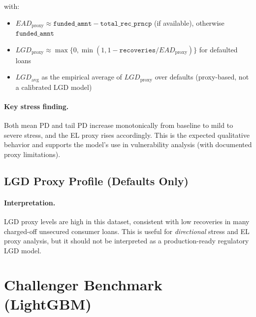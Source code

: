 \documentclass[11pt,a4paper]{article}
\begin{document}
with:
\begin{itemize}[leftmargin=*, itemsep=0.25em]
\item \(EAD_{\text{proxy}} \approx \texttt{funded\_amnt} - \texttt{total\_rec\_prncp}\) (if available), otherwise \(\texttt{funded\_amnt}\)
\item \(LGD_{\text{proxy}} \approx \max\{0,\min(1,1-\texttt{recoveries}/EAD_{\text{proxy}})\}\) for defaulted loans
\item \(LGD_{\text{avg}}\) as the empirical average of \(LGD_{\text{proxy}}\) over defaults (proxy-based, not a calibrated LGD model)
\end{itemize}

\begin{table}[H]
\centering
\caption{Stress scenarios (OOT): PD and EL proxy shifts.}
\label{tab:stress}

\end{table}

\paragraph{Key stress finding.}
Both mean PD and tail PD increase monotonically from baseline to mild to severe stress, and the EL proxy rises accordingly. This is the expected qualitative behavior and supports the model's use in vulnerability analysis (with documented proxy limitations).

\subsection{LGD Proxy Profile (Defaults Only)}
\begin{table}[H]
\centering
\caption{LGD proxy by grade (defaults only): summary statistics.}
\label{tab:lgd_by_grade}
{\setlength{\tabcolsep}{4pt}\renewcommand{\arraystretch}{1.08}}
\end{table}

\paragraph{Interpretation.}
LGD proxy levels are high in this dataset, consistent with low recoveries in many charged-off unsecured consumer loans. This is useful for \emph{directional} stress and EL proxy analysis, but it should not be interpreted as a production-ready regulatory LGD model.

\clearpage
\section{Challenger Benchmark (LightGBM)}
\end{document}
